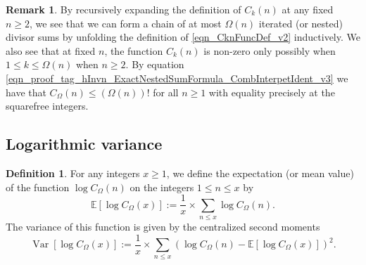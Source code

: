 \documentclass[11pt,reqno,a4letter]{article}
\numberwithin{equation}{section}
\numberwithin{figure}{section}
\numberwithin{table}{section}
\theoremstyle{plain}
\numberwithin{theorem}{section}
\theoremstyle{definition}
\newtheorem{remark}[theorem]{Remark}
\newtheorem{definition}[theorem]{Definition}
\theoremstyle{remark}
\begin{document}
\begin{remark}
By recursively expanding the definition of $C_k(n)$ 
at any fixed $n \geq 2$, we see that 
we can form a chain of at most $\Omega(n)$ iterated (or nested) divisor sums by 
unfolding the definition of \eqref{eqn_CknFuncDef_v2} inductively. 
We also see that at fixed $n$, the function 
$C_k(n)$ is non-zero only possibly when 
$1 \leq k \leq \Omega(n)$ when $n \geq 2$. 
By equation \eqref{eqn_proof_tag_hInvn_ExactNestedSumFormula_CombInterpetIdent_v3} we have 
that $C_{\Omega}(n) \leq (\Omega(n))!$ for all $n \geq 1$ with 
equality precisely at the squarefree integers. 
\end{remark}

\subsection{Logarithmic variance}
\label{subSection_AvgOrdersOfTheUnsignedSequences} 

\begin{definition}
\label{def_AvgOrder_FirstAndSecondMomentsOfFuncs_v1}
For any integers $x \geq 1$, we define the expectation (or mean value) of the 
function $\log C_{\Omega}(n)$ on the integers $1 \leq n \leq x$ by 
\[
\mathbb{E}\left[\log C_{\Omega}(x)\right] := \frac{1}{x} \times \sum_{n \leq x} 
     \log C_{\Omega}(n). 
\]
The variance of this function is given by the 
centralized second moments 
\[
\operatorname{Var}\left[\log C_{\Omega}(x)\right] := 
	\frac{1}{x} \times \sum_{n \leq x} \left(\log C_{\Omega}(n) - 
	\mathbb{E}\left[\log C_{\Omega}(x)\right]\right)^2. 
\]
\end{definition}
\end{document}
